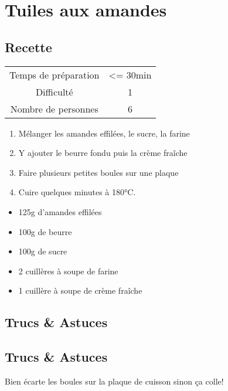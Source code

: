 \newpage
\section{Tuiles aux amandes}
    \label{sec:Tuiles aux amandes}
    \subsection{Recette}
    \vspace{1cm}


    \begin{center}
        \begin{tabular}{c|c}
            Temps de préparation & <= 30min \\
            Difficulté & 1 \\
            Nombre de personnes & 6 
        \end{tabular}
    \end{center}{}

    \vspace{1cm}
    \hline
    \vspace{1cm}

    \begin{minipage}{.7\textwidth}
        \begin{enumerate}
            \item Mélanger les amandes effilées, le sucre, la farine
	    \item Y ajouter le beurre fondu puis la crème fraîche
	    \item Faire plusieurs petites boules sur une plaque
	    \item Cuire quelques minutes à 180°C.

        \end{enumerate}
    \end{minipage}
    \begin{minipage}{.3\textwidth}
        \begin{flushleft}
        \begin{itemize}
            \item 125g d'amandes effilées
	    \item 100g de beurre
	    \item 100g de sucre
	    \item 2 cuillères à soupe de farine
	    \item 1 cuillère à soupe de crème fraîche

        \end{itemize}
        \end{flushleft}
    \end{minipage}
    
    \vspace{1cm}
    \hline
    \vspace{1cm}
    
    \subsection{Trucs \& Astuces}
        \subsection{Trucs \& Astuces}
	Bien écarte les boules sur la plaque de cuisson sinon ça colle!
